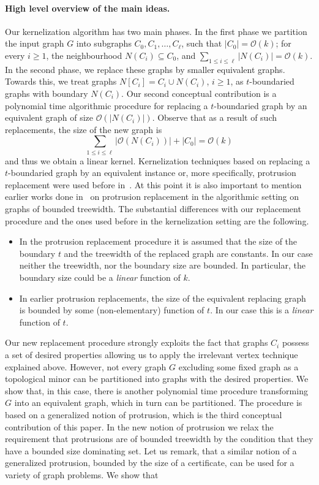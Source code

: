 \documentclass[11pt]{article}
\newcommand{\cO}{\mathcal{O}}
\begin{document}
\paragraph{High level overview of the main  ideas.}
Our kernelization algorithm has two main phases. In the first phase we partition the input graph $G$ into subgraphs $C_0, C_1, \dots, C_\ell$, such that 
 $|C_0|=\cO(k)$; for every $i\geq 1$, the neighbourhood $N(C_i)\subseteq C_0$,  and $\sum_{1\leq i\leq \ell} |N(C_i)|=\cO(k)$.   In the second phase, we replace these graphs by smaller equivalent graphs.  Towards this, we treat 
  graphs $N[C_i]=C_i \cup N(C_i)$, $i\geq 1$,  as $t$-boundaried graphs with boundary $N(C_i)$. Our second  conceptual contribution is a  polynomial time algorithmic procedure for replacing a $t$-boundaried graph by an equivalent graph of size $\cO(|N(C_i)|)$.   Observe that as a result of such replacements, the size of the new graph is 
  $$\sum_{1\leq i\leq \ell} |\cO(N(C_i))| +|C_0|=\cO(k)$$ 
  and thus we obtain a linear kernel. 
  Kernelization techniques based on replacing a $t$-boundaried graph by an equivalent instance or, more specifically, protrusion replacement were used before in~\cite{H.Bodlaender:2009ng,F.V.Fomin:2010oq,FominLMPS11, abs-1207-0835}. At this point it is also important to mention earlier works done in~\cite{FellowsL89,ArnborgCPS93,BodlaendervA01a,Fluiter97,BodlaenderH98}  
  on protrusion replacement in the algorithmic setting on graphs of bounded treewidth. 
  The substantial differences  with our replacement 
  procedure  and the ones used before in the kernelization setting are the following. 
  \begin{itemize}
  \item In the protrusion replacement procedure it is assumed that the size of the boundary $t$ and the treewidth  of the replaced graph are constants. In our case neither the treewidth, nor the boundary size are  bounded. In particular, the boundary size  could be a {\em linear} function of $k$.
  \item In earlier protrusion replacements, the size of the equivalent replacing graph is bounded by some (non-elementary) function of $t$. In our case this is a {\sl linear} function of $t$.  
  \end{itemize} 
Our new  replacement procedure strongly exploits the fact that graphs $C_i$ possess 
 a set of desired properties allowing us to apply the irrelevant vertex technique explained above. 
However, not every graph $G$ excluding some fixed graph   as a topological minor can be partitioned into graphs with the desired properties.  We show that, in this case, there is  another polynomial time procedure transforming $G$ into an equivalent graph, which in turn can be partitioned. The procedure is based on a generalized notion of protrusion, which is the third conceptual contribution of this paper. In the new notion of protrusion we relax  the requirement that protrusions are of bounded treewidth by the condition   that they  have a bounded size dominating set. Let us remark, that a similar notion of a generalized protrusion, bounded by the size of a certificate, can be used  for a variety of graph problems. We show that
\end{document}
